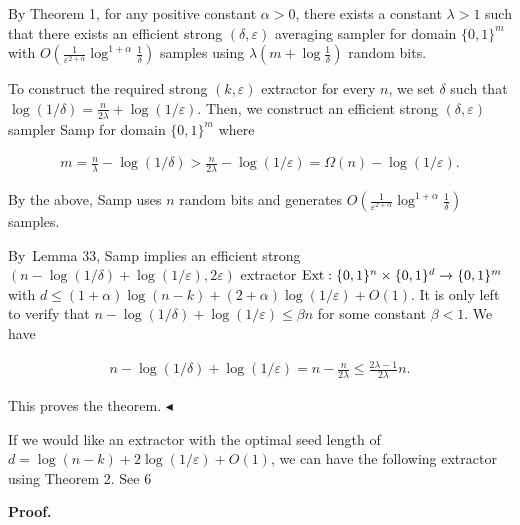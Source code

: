 \documentclass[10pt,a4paper]{article}
\begin{document}
By Theorem 1, for any positive constant $\alpha>0$, there exists a constant $\lambda>1$ such that there exists an efficient strong $(\delta,\varepsilon)$ averaging sampler for domain $\{0,1\}^{m}$ with $O(\frac{1}{\varepsilon^{2+\alpha}}\log^{1+\alpha}\frac{1}{\delta})$ samples using $\lambda(m+\log\frac{1}{\delta})$ random bits.\par




To construct the required strong $(k,\varepsilon)$ extractor for every $n$, we set $\delta$ such that $\log(1/\delta)=\frac{n}{2\lambda}+\log(1/\varepsilon)$.
Then, we construct an efficient strong $(\delta,\varepsilon)$ sampler Samp for domain $\{0,1\}^{m}$ where\par


\[\begin{gathered}
m=\frac{n}{\lambda}-\log(1/\delta)>\frac{n}{2\lambda}-\log(1/\varepsilon)=\Omega(n)-\log(1/\varepsilon).
\end{gathered}\]


By the above, Samp uses $n$ random bits and generates $O(\frac{1}{\varepsilon^{2+\alpha}}\log^{1+\alpha}\frac{1}{\delta})$ samples.\par




By Lemma 33, Samp implies an efficient strong $(n-\log(1/\delta)+\log(1/\varepsilon),2\varepsilon)$ extractor $\textup{{Ext}}:\{0,1\}^{n}\times\{0,1\}^{d}\to\{0,1\}^{m}$ with $d\leq(1+\alpha)\log(n-k)+(2+\alpha)\log(1/\varepsilon)+O(1)$.
It is only left to verify that $n-\log(1/\delta)+\log(1/\varepsilon)\leq\beta n$ for some constant $\beta<1$. We have\par


\[\begin{gathered}
n-\log(1/\delta)+\log(1/\varepsilon)=n-\frac{n}{2\lambda}\leq\frac{2\lambda-1}{2\lambda}n.
\end{gathered}\]


This proves the theorem.
$\blacktriangleleft$\par




If we would like an extractor with the optimal seed length of $d=\log(n-k)+2\log(1/\varepsilon)+O(1)$, we can have the following extractor using Theorem 2.
See 6\par





\par\medskip\noindent\textbf{Proof.}\par
\end{document}
